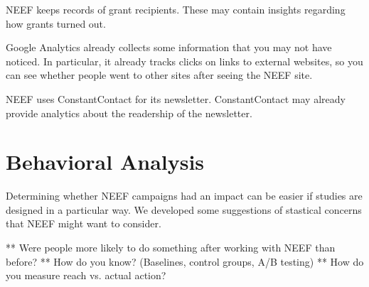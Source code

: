 \documentclass{article}
\begin{document}
NEEF keeps records of grant recipients. These may contain insights regarding
how grants turned out.

Google Analytics already collects some information that you may not have noticed.
In particular, it already tracks clicks on links to external websites, so you
can see whether people went to other sites after seeing the NEEF site.

NEEF uses ConstantContact for its newsletter. ConstantContact may already
provide analytics about the readership of the newsletter.

\section{Behavioral Analysis}
Determining whether NEEF campaigns had an impact
can be easier if studies are designed in a particular way.
We developed some suggestions of stastical concerns that
NEEF might want to consider.

** Were people more likely to do something after working with NEEF than before?
** How do you know?  (Baselines, control groups, A/B testing)
** How do you measure reach vs. actual action?
\end{document}
